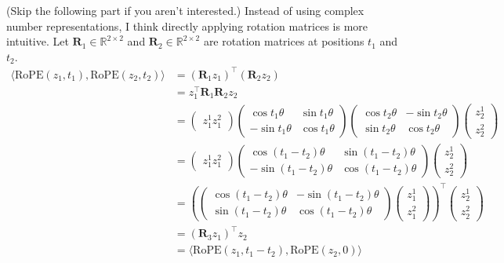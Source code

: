 \begin{parts}
\begin{subparts}
{    (Skip the following part if you aren't interested.) \newline
    Instead of using complex number representations, I think directly applying rotation matrices is more intuitive. Let $\mathbf{R}_1 \in \mathbb{R}^{2 \times 2}$ and $\mathbf{R}_2 \in \mathbb{R}^{2 \times 2}$ are rotation matrices at positions $t_1$ and $t_2$.
    \begin{align*}
        \langle \text{RoPE}(z_1, t_1), \text{RoPE}(z_2, t_2) \rangle
        &= (\mathbf{R}_1 z_1)^\top (\mathbf{R}_2 z_2) \\
        &= z_1^\top \mathbf{R}_1 \mathbf{R}_2 z_2 \\
        &= 
        \begin{pmatrix}
            z_1^1 z_1^2
        \end{pmatrix}
        \begin{pmatrix}
            \cos t_1 \theta & \sin t_1 \theta \\ -\sin t_1 \theta  & \cos t_1 \theta
        \end{pmatrix} 
        \begin{pmatrix}
            \cos t_2 \theta & -\sin t_2 \theta \\ \sin t_2 \theta  & \cos t_2 \theta
        \end{pmatrix} 
        \begin{pmatrix}
            z_2^1 \\ z_2^2
        \end{pmatrix} \\
        &= 
        \begin{pmatrix}
            z_1^1 z_1^2
        \end{pmatrix}
        \begin{pmatrix}
            \cos (t_1 - t_2) \theta & \sin (t_1 - t_2) \theta \\ 
            -\sin (t_1 - t_2) \theta  & \cos (t_1 - t_2) \theta
        \end{pmatrix} 
        \begin{pmatrix}
            z_2^1 \\ z_2^2
        \end{pmatrix} \\
        &= 
        (\begin{pmatrix}
            \cos (t_1 - t_2) \theta & -\sin (t_1 - t_2) \theta \\ 
            \sin (t_1 - t_2) \theta  & \cos (t_1 - t_2) \theta
        \end{pmatrix}
        \begin{pmatrix}
            z_1^1 \\ z_1^2
        \end{pmatrix})^\top
        \begin{pmatrix}
            z_2^1 \\ z_2^2
        \end{pmatrix} \\
        &= (\mathbf{R}_{3} z_1)^\top z_2 \\
        &= \langle \text{RoPE}(z_1, t_1 - t_2), \text{RoPE}(z_2, 0) \rangle
    \end{align*}

}
\end{subparts}
\end{parts}
